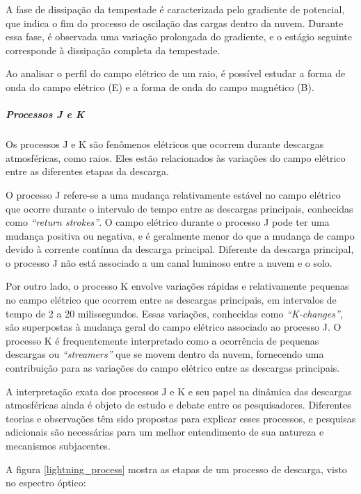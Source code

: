 \documentclass[a4paper, 12pt, onecolumn,singlespacing]{article}
\begin{document}
		A fase de dissipação da tempestade é caracterizada pelo gradiente de potencial, que indica o fim do processo de oscilação das cargas dentro da nuvem. Durante essa fase, é observada uma variação prolongada do gradiente, e o estágio seguinte corresponde à dissipação completa da tempestade.
		
		Ao analisar o perfil do campo elétrico de um raio, é possível estudar a forma de onda do campo elétrico (E) e a forma de onda do campo magnético (B).
		
		\subparagraph{Processos J e K}
		Os processos J e K são fenômenos elétricos que ocorrem durante descargas atmosféricas, como raios. Eles estão relacionados às variações do campo elétrico entre as diferentes etapas da descarga.
		
		O processo J refere-se a uma mudança relativamente estável no campo elétrico que ocorre durante o intervalo de tempo entre as descargas principais, conhecidas como \textit{``return strokes''}. O campo elétrico durante o processo J pode ter uma mudança positiva ou negativa, e é geralmente menor do que a mudança de campo devido à corrente contínua da descarga principal. Diferente da descarga principal, o processo J não está associado a um canal luminoso entre a nuvem e o solo.
		
		Por outro lado, o processo K envolve variações rápidas e relativamente pequenas no campo elétrico que ocorrem entre as descargas principais, em intervalos de tempo de 2 a 20 milissegundos. Essas variações, conhecidas como \textit{``K-changes''}, são superpostas à mudança geral do campo elétrico associado ao processo J. O processo K é frequentemente interpretado como a ocorrência de pequenas descargas ou \textit{``streamers''} que se movem dentro da nuvem, fornecendo uma contribuição para as variações do campo elétrico entre as descargas principais.
		
		A interpretação exata dos processos J e K e seu papel na dinâmica das descargas atmosféricas ainda é objeto de estudo e debate entre os pesquisadores. Diferentes teorias e observações têm sido propostas para explicar esses processos, e pesquisas adicionais são necessárias para um melhor entendimento de sua natureza e mecanismos subjacentes.

		A figura \ref{lightning_process} mostra as etapas de um processo de descarga, visto no espectro óptico:
		
\end{document}
